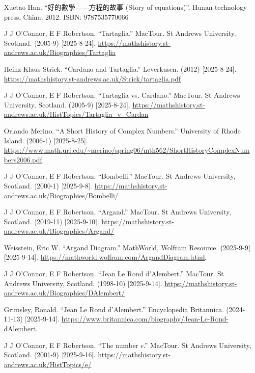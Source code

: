 Xuetao Han. ``好的數學——方程的故事 (Story of equations)''. Hunan technology press, China. 2012. ISBN: 9787535770066

J J O'Connor, E F Robertson. ``Tartaglia.'' MacTour. St Andrews University, Scotland. (2005-9) [2025-8-24]. \url{https://mathshistory.st-andrews.ac.uk/Biographies/Tartaglia}

Heinz Klaus Strick. ``Cardano and Tartaglia.'' Leverkusen. (2012) [2025-8-24]. \url{https://mathshistory.st-andrews.ac.uk/Strick/tartaglia.pdf}

J J O'Connor, E F Robertson. ``Tartaglia vs. Cardano.'' MacTour. St Andrews University, Scotland. (2005-9) [2025-8-24]. \url{https://mathshistory.st-andrews.ac.uk/HistTopics/Tartaglia_v_Cardan} %

Orlando Merino. ``A Short History of Complex Numbers.'' University of Rhode Island. (2006-1) [2025-8-25]. \url{https://www.math.uri.edu/~merino/spring06/mth562/ShortHistoryComplexNumbers2006.pdf}.

J J O'Connor, E F Robertson. ``Bombelli.'' MacTour. St Andrews University, Scotland. (2000-1) [2025-9-8]. \url{https://mathshistory.st-andrews.ac.uk/Biographies/Bombelli/}

J J O'Connor, E F Robertson. ``Argand.'' MacTour. St Andrews University, Scotland. (2019-11) [2025-9-10]. \url{https://mathshistory.st-andrews.ac.uk/Biographies/Argand/}

Weisstein, Eric W. ``Argand Diagram.'' MathWorld, Wolfram Resource. (2025-9-9) [2025-9-14]. \url{https://mathworld.wolfram.com/ArgandDiagram.html}.

J J O'Connor, E F Robertson. ``Jean Le Rond d'Alembert.'' MacTour. St Andrews University, Scotland. (1998-10) [2025-9-14]. \url{https://mathshistory.st-andrews.ac.uk/Biographies/DAlembert/}

Grimsley, Ronald. ``Jean Le Rond d'Alembert.'' Encyclopedia Britannica. (2024-11-13) [2025-9-14]. \url{https://www.britannica.com/biography/Jean-Le-Rond-dAlembert}.

J J O'Connor, E F Robertson. ``The number $e$.'' MacTour. St Andrews University, Scotland. (2001-9) [2025-9-16]. \url{https://mathshistory.st-andrews.ac.uk/HistTopics/e/}

